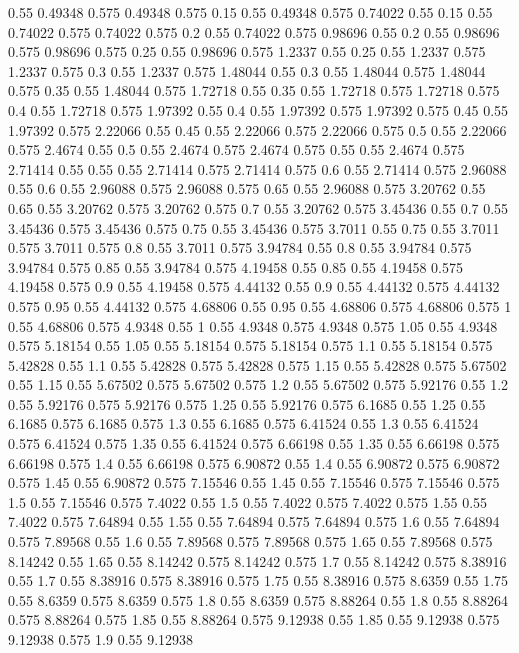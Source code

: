 0.55 0.49348
0.575 0.49348
0.575 0.15
0.55 0.49348
0.575 0.74022
0.55 0.15
0.55 0.74022
0.575 0.74022
0.575 0.2
0.55 0.74022
0.575 0.98696
0.55 0.2
0.55 0.98696
0.575 0.98696
0.575 0.25
0.55 0.98696
0.575 1.2337
0.55 0.25
0.55 1.2337
0.575 1.2337
0.575 0.3
0.55 1.2337
0.575 1.48044
0.55 0.3
0.55 1.48044
0.575 1.48044
0.575 0.35
0.55 1.48044
0.575 1.72718
0.55 0.35
0.55 1.72718
0.575 1.72718
0.575 0.4
0.55 1.72718
0.575 1.97392
0.55 0.4
0.55 1.97392
0.575 1.97392
0.575 0.45
0.55 1.97392
0.575 2.22066
0.55 0.45
0.55 2.22066
0.575 2.22066
0.575 0.5
0.55 2.22066
0.575 2.4674
0.55 0.5
0.55 2.4674
0.575 2.4674
0.575 0.55
0.55 2.4674
0.575 2.71414
0.55 0.55
0.55 2.71414
0.575 2.71414
0.575 0.6
0.55 2.71414
0.575 2.96088
0.55 0.6
0.55 2.96088
0.575 2.96088
0.575 0.65
0.55 2.96088
0.575 3.20762
0.55 0.65
0.55 3.20762
0.575 3.20762
0.575 0.7
0.55 3.20762
0.575 3.45436
0.55 0.7
0.55 3.45436
0.575 3.45436
0.575 0.75
0.55 3.45436
0.575 3.7011
0.55 0.75
0.55 3.7011
0.575 3.7011
0.575 0.8
0.55 3.7011
0.575 3.94784
0.55 0.8
0.55 3.94784
0.575 3.94784
0.575 0.85
0.55 3.94784
0.575 4.19458
0.55 0.85
0.55 4.19458
0.575 4.19458
0.575 0.9
0.55 4.19458
0.575 4.44132
0.55 0.9
0.55 4.44132
0.575 4.44132
0.575 0.95
0.55 4.44132
0.575 4.68806
0.55 0.95
0.55 4.68806
0.575 4.68806
0.575 1
0.55 4.68806
0.575 4.9348
0.55 1
0.55 4.9348
0.575 4.9348
0.575 1.05
0.55 4.9348
0.575 5.18154
0.55 1.05
0.55 5.18154
0.575 5.18154
0.575 1.1
0.55 5.18154
0.575 5.42828
0.55 1.1
0.55 5.42828
0.575 5.42828
0.575 1.15
0.55 5.42828
0.575 5.67502
0.55 1.15
0.55 5.67502
0.575 5.67502
0.575 1.2
0.55 5.67502
0.575 5.92176
0.55 1.2
0.55 5.92176
0.575 5.92176
0.575 1.25
0.55 5.92176
0.575 6.1685
0.55 1.25
0.55 6.1685
0.575 6.1685
0.575 1.3
0.55 6.1685
0.575 6.41524
0.55 1.3
0.55 6.41524
0.575 6.41524
0.575 1.35
0.55 6.41524
0.575 6.66198
0.55 1.35
0.55 6.66198
0.575 6.66198
0.575 1.4
0.55 6.66198
0.575 6.90872
0.55 1.4
0.55 6.90872
0.575 6.90872
0.575 1.45
0.55 6.90872
0.575 7.15546
0.55 1.45
0.55 7.15546
0.575 7.15546
0.575 1.5
0.55 7.15546
0.575 7.4022
0.55 1.5
0.55 7.4022
0.575 7.4022
0.575 1.55
0.55 7.4022
0.575 7.64894
0.55 1.55
0.55 7.64894
0.575 7.64894
0.575 1.6
0.55 7.64894
0.575 7.89568
0.55 1.6
0.55 7.89568
0.575 7.89568
0.575 1.65
0.55 7.89568
0.575 8.14242
0.55 1.65
0.55 8.14242
0.575 8.14242
0.575 1.7
0.55 8.14242
0.575 8.38916
0.55 1.7
0.55 8.38916
0.575 8.38916
0.575 1.75
0.55 8.38916
0.575 8.6359
0.55 1.75
0.55 8.6359
0.575 8.6359
0.575 1.8
0.55 8.6359
0.575 8.88264
0.55 1.8
0.55 8.88264
0.575 8.88264
0.575 1.85
0.55 8.88264
0.575 9.12938
0.55 1.85
0.55 9.12938
0.575 9.12938
0.575 1.9
0.55 9.12938
